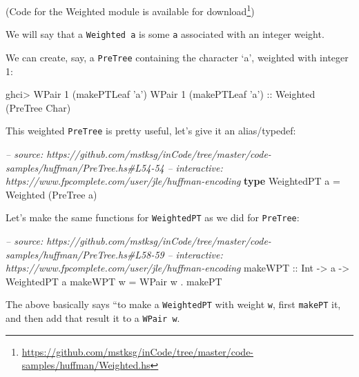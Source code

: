 \documentclass[]{article}
\newenvironment{Shaded}{}{}
\newcommand{\KeywordTok}[1]{\textcolor[rgb]{0.00,0.44,0.13}{\textbf{#1}}}
\newcommand{\DataTypeTok}[1]{\textcolor[rgb]{0.56,0.13,0.00}{#1}}
\newcommand{\DecValTok}[1]{\textcolor[rgb]{0.25,0.63,0.44}{#1}}
\newcommand{\CharTok}[1]{\textcolor[rgb]{0.25,0.44,0.63}{#1}}
\newcommand{\CommentTok}[1]{\textcolor[rgb]{0.38,0.63,0.69}{\textit{#1}}}
\newcommand{\OtherTok}[1]{\textcolor[rgb]{0.00,0.44,0.13}{#1}}
\newcommand{\FunctionTok}[1]{\textcolor[rgb]{0.02,0.16,0.49}{#1}}
\newcommand{\NormalTok}[1]{#1}
\renewcommand{\href}[2]{#2\footnote{\url{#1}}}
\begin{document}
(Code for the Weighted module is
\href{https://github.com/mstksg/inCode/tree/master/code-samples/huffman/Weighted.hs}{available
for download})

We will say that a \texttt{Weighted\ a} is some \texttt{a} associated with an
integer weight.

We can create, say, a \texttt{PreTree} containing the character `a', weighted
with integer 1:

\begin{Shaded}
\begin{Highlighting}[]
\NormalTok{ghci}\FunctionTok{>} \DataTypeTok{WPair} \DecValTok{1}\NormalTok{ (makePTLeaf }\CharTok{'a'}\NormalTok{)}
\DataTypeTok{WPair} \DecValTok{1}\NormalTok{ (makePTLeaf }\CharTok{'a'}\NormalTok{)}\OtherTok{ ::} \DataTypeTok{Weighted}\NormalTok{ (}\DataTypeTok{PreTree} \DataTypeTok{Char}\NormalTok{)}
\end{Highlighting}
\end{Shaded}

This weighted \texttt{PreTree} is pretty useful, let's give it an alias/typedef:

\begin{Shaded}
\begin{Highlighting}[]
\CommentTok{-- source: https://github.com/mstksg/inCode/tree/master/code-samples/huffman/PreTree.hs#L54-54}
\CommentTok{-- interactive: https://www.fpcomplete.com/user/jle/huffman-encoding}
\KeywordTok{type} \DataTypeTok{WeightedPT}\NormalTok{ a }\FunctionTok{=} \DataTypeTok{Weighted}\NormalTok{ (}\DataTypeTok{PreTree}\NormalTok{ a)}
\end{Highlighting}
\end{Shaded}

Let's make the same functions for \texttt{WeightedPT} as we did for
\texttt{PreTree}:

\begin{Shaded}
\begin{Highlighting}[]
\CommentTok{-- source: https://github.com/mstksg/inCode/tree/master/code-samples/huffman/PreTree.hs#L58-59}
\CommentTok{-- interactive: https://www.fpcomplete.com/user/jle/huffman-encoding}
\OtherTok{makeWPT ::} \DataTypeTok{Int} \OtherTok{->}\NormalTok{ a }\OtherTok{->} \DataTypeTok{WeightedPT}\NormalTok{ a}
\NormalTok{makeWPT w }\FunctionTok{=} \DataTypeTok{WPair}\NormalTok{ w }\FunctionTok{.}\NormalTok{ makePT}
\end{Highlighting}
\end{Shaded}

The above basically says ``to make a \texttt{WeightedPT} with weight \texttt{w},
first \texttt{makePT} it, and then add that result it to a \texttt{WPair\ w}.
\end{document}
